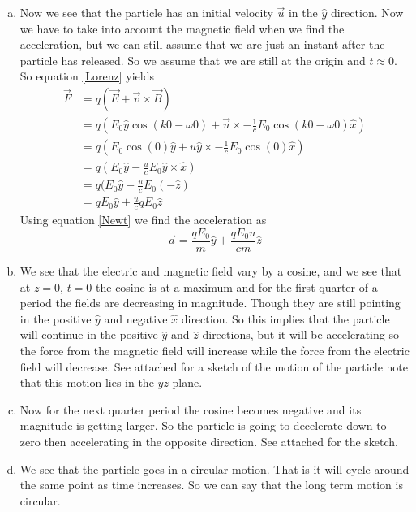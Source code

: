 \documentclass[11pt]{article}
\numberwithin{equation}{section}
\newcommand{\vecE}{\vec{E}}
\begin{document}
\begin{enumerate}[(a)]
\item
Now we see that the particle has an initial velocity $\vec{u}$ in the $\hat{y}$ direction. Now we have to take into account the magnetic field when we find the acceleration, but we can still assume that we are just an instant after the particle has released. So we assume that we are still at the origin and $t\approx 0$. So equation \ref{Lorenz} yields
\begin{align*}
\vec{F} &= q(\vecE+\vec{v}\times\vec{B})\\
&= q(E_0\hat{y}\cos(k0-\omega 0)+\vec{u}\times-\frac{1}{c}E_0\cos(k0-\omega 0)\hat{x})\\
&= q(E_0\cos(0)\hat{y}+u\hat{y}\times-\frac{1}{c}E_0\cos(0)\hat{x})\\
&= q(E_0\hat{y}-\frac{u}{c}E_0\hat{y}\times\hat{x})\\
&= q(E_0\hat{y}-\frac{u}{c}E_0(-\hat{z})\\
&= qE_0\hat{y}+\frac{u}{c}qE_0\hat{z}
\end{align*}
Using equation \ref{Newt} we find the acceleration as
$$\vec{a} = \frac{qE_0}{m}\hat{y}+\frac{qE_0u}{cm}\hat{z}$$

\item
We see that the electric and magnetic field vary by a cosine, and we see that at $z=0$, $t=0$ the cosine is at a maximum and for the first quarter of a period the fields are decreasing in magnitude. Though they are still pointing in the positive $\hat{y}$ and negative $\hat{x}$ direction. So this implies that the particle will continue in the positive $\hat{y}$ and $\hat{z}$ directions, but it will be accelerating so the force from the magnetic field will increase while the force from the electric field will decrease. See attached for a sketch of the motion of the particle note that this motion lies in the $yz$ plane. 

\item
Now for the next quarter period the cosine becomes negative and its magnitude is getting larger. So the particle is going to decelerate down to zero then accelerating in the opposite direction. See attached for the sketch.

\item
We see that the particle goes in a circular motion. That is it will cycle around the same point as time increases. So we can say that the long term motion is circular.

\end{enumerate}
\end{document}
